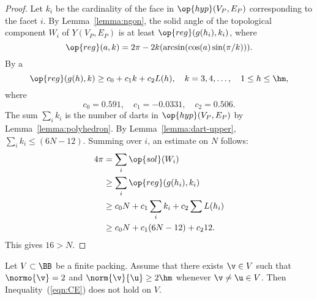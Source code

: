 \begin{proof}
Let $k_i$ be the cardinality of the face in $\op{hyp}(V_P,E_P)$
corresponding to the facet $i$.  By Lemma~\ref{lemma:ngon}, the solid
angle of the topological component $W_i$ of $Y(V_P,E_P)$ is at least
$\op{reg}(g(h_i),k_i)$, where %
%
%
\[  
\op{reg}(a,k) = 2\pi - 2 k (\arcsin(\cos(a)\sin(\pi/k))).
\] 
By a  
\begin{equation}\label{eqn:alin} 
\op{reg}(g(h),k) \ge c_0 + c_1 k + c_2 L(h),\quad
k = 3,4,\ldots,\quad 1\le h\le \hm,
\end{equation}
where
\[ 
c_0=0.591,\quad c_1=-0.0331,\quad c_2 = 0.506.
\]  The sum $\sum_i k_i$ is the number of darts
in $\op{hyp}(V_P,E_P)$ by  Lemma~\ref{lemma:polyhedron}.  By
Lemma~\ref{lemma:dart-upper}, $\sum_i k_i \le (6N-12)$.  Summing over
$i$, an estimate on $N$ follows: 
%
%
\begin{align*} 
4\pi &= \sum_i\op{sol}(W_i)\\
&\ge \sum_i \op{reg}(g(h_i),k_i) \\
&\ge c_0 N +c_1\sum_i k_i + c_2 \sum L(h_i)\\
&\ge c_0 N +c_1 (6N-12) + c_2 12.
\end{align*}
This gives
$16 > N$.
\end{proof} 


\begin{lemma}[]\label{lemma:D'}  
Let $ V\subset\BB$ be a finite packing.
Assume that there exists $ \v\in V$ such that $\normo{ \v}=2$ and
$\norm{ \v}{ \u}\ge 2\hm$ whenever $\v\ne\u\in V$.
Then  Inequality~(\ref{eqn:CE}) does not hold on $ V$.
\end{lemma}

